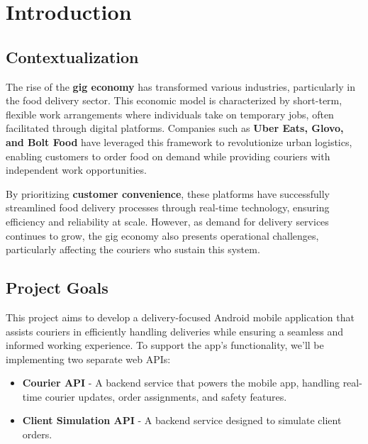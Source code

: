 \documentclass[a4paper,twoside,11pt]{article}
\begin{document}
{\sffamily
\section*{Introduction}

\vspace{5mm}

\subsection*{Contextualization}

\vspace{3mm}

The rise of the \textbf{gig economy} has transformed various industries, particularly in the food delivery sector. This economic model is characterized by short-term, flexible work arrangements where individuals take on temporary jobs, often facilitated through digital platforms. Companies such as \textbf{Uber Eats, Glovo, and Bolt Food} have leveraged this framework to revolutionize urban logistics, enabling customers to order food on demand while providing couriers with independent work opportunities.

\vspace{5mm}

By prioritizing \textbf{customer convenience}, these platforms have successfully streamlined food delivery processes through real-time technology, ensuring efficiency and reliability at scale. However, as demand for delivery services continues to grow, the gig economy also presents operational challenges, particularly affecting the couriers who sustain this system.

\newpage

\subsection*{Project Goals}

This project aims to develop a delivery-focused Android mobile application that assists couriers in efficiently handling deliveries while ensuring a seamless and informed working experience. To support the app’s functionality, we'll be implementing two separate web APIs:

\begin{itemize}
    \item \textbf{Courier API} -  A backend service that powers the mobile app, handling real-time courier updates, order assignments, and safety features.
    \item \textbf{Client Simulation API} - A backend service designed to simulate client orders.
\end{itemize}

}
\end{document}

